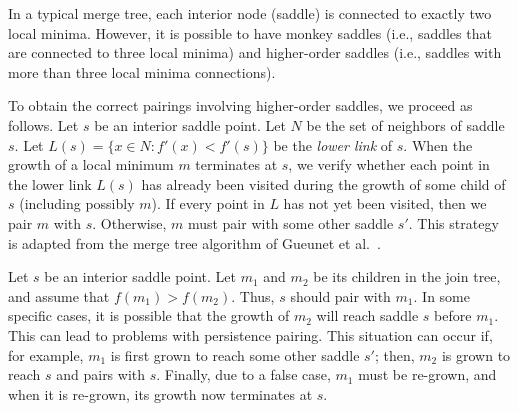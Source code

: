 In a typical merge tree, each interior node (saddle) is connected to exactly two local minima. However, it is possible to have monkey saddles (i.e., saddles that are connected to three local minima) and higher-order saddles (i.e., saddles with more than three local minima connections).



To obtain the correct pairings involving higher-order saddles, we proceed as follows. 
Let $s$ be an interior saddle point. 
Let $N$ be the set of neighbors of saddle $s$. 
Let $L(s) = \{x \in N : f'(x) < f'(s)\}$ be the \textit{lower link} of $s$. When the growth of a local minimum $m$ terminates at $s$, we verify whether each point in the lower link $L(s)$ has already been visited during the growth of some child of $s$ (including possibly $m$). If every point in $L$ has not yet been visited, then we pair $m$ with $s$. Otherwise, $m$ must pair with some other saddle $s'$. This strategy is adapted from the merge tree algorithm of Gueunet et al.~\cite{gueunet2017task}.

 Let $s$ be an interior saddle point. Let $m_1$ and $m_2$ be its children in the join tree, and assume that $f(m_1) > f(m_2)$. Thus, $s$ should pair with $m_1$. In some specific cases, it is possible that the growth of $m_2$ will reach saddle $s$ before $m_1$. This can lead to problems with persistence pairing. This situation can occur if, for example, $m_1$ is first grown to reach some other saddle $s'$; then, $m_2$ is grown to reach $s$ and pairs with $s$. Finally, due to a false case, $m_1$ must be re-grown, and when it is re-grown, its growth now terminates at $s$.

